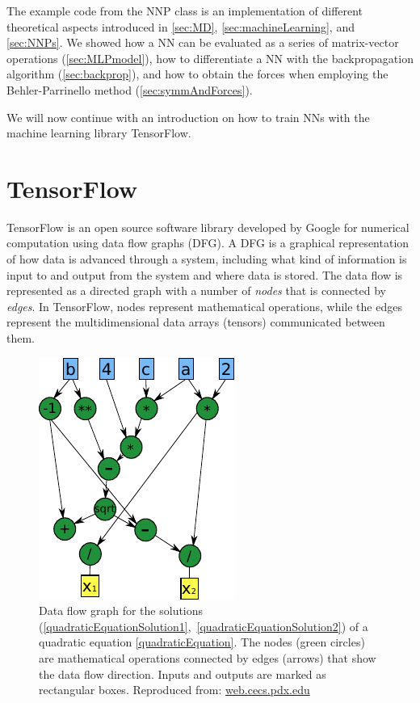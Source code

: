 \documentclass[twoside,english]{uiofysmaster}
\begin{document}
The example code from the NNP class is an implementation of different theoretical aspects 
introduced in \autoref{sec:MD}, \ref{sec:machineLearning}, and \ref{sec:NNPs}. We showed how a
NN can be evaluated as a series of matrix-vector operations (\autoref{sec:MLPmodel}), 
how to differentiate a NN with the backpropagation algorithm  (\autoref{sec:backprop}), and how to 
obtain the forces when employing the Behler-Parrinello method (\autoref{sec:symmAndForces}). 

We will now continue with an introduction on how to train NNs with the machine learning library TensorFlow. 






\chapter{TensorFlow}
TensorFlow \cite{Abadi15} \cite{Abadi16} is an open source software library 
developed by Google 
for numerical computation using data flow graphs (DFG). 
A DFG is a graphical representation of how data is
advanced through a system, including what kind of information is input
to and output from the system and where data is stored.
The data flow is represented as a directed graph
with a number of \textit{nodes} that is connected by
\textit{edges}. In TensorFlow, nodes represent
mathematical operations, while the edges represent
the multidimensional data arrays (tensors) 
communicated between them.
\begin{figure}
\centering
  \includegraphics[width=0.4\linewidth]{Figures/Implementation/DFG.pdf}
  \caption{Data flow graph for the solutions (\ref{quadraticEquationSolution1},~\ref{quadraticEquationSolution2}) of a 
	   quadratic equation \eqref{quadraticEquation}. The nodes (green circles) are mathematical 
	   operations connected by edges (arrows) that show the data flow direction. Inputs and outputs
	   are marked as rectangular boxes. Reproduced from:
  \href{http://web.cecs.pdx.edu/mperkows/temp/JULY/data-flow-graph.pdf}{web.cecs.pdx.edu}}
  \label{fig:DFG}
\end{figure}
\end{document}
